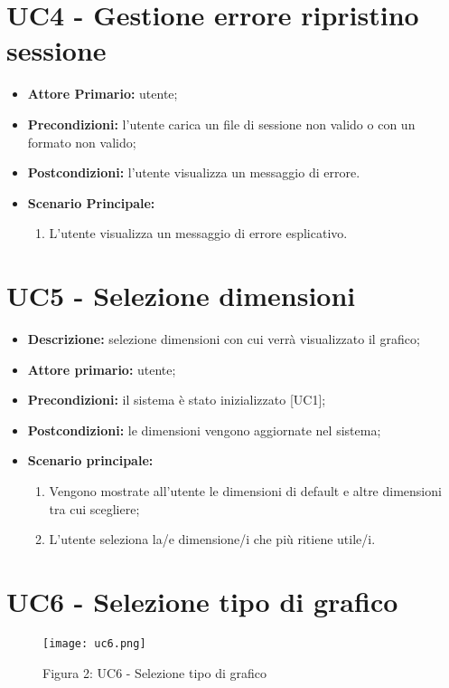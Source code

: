 \section{UC4 - Gestione errore ripristino sessione}
\begin{itemize}
  \item \textbf{Attore Primario:} utente;
  \item \textbf{Precondizioni:} l'utente carica un file di sessione non valido o con un formato non valido;
  \item \textbf{Postcondizioni:} l'utente visualizza un messaggio di errore.
  \item \textbf{Scenario Principale:}
  \begin{enumerate}
    \item L'utente visualizza un messaggio di errore esplicativo.
  \end{enumerate}
\end{itemize}

\section{UC5 - Selezione dimensioni}
 \begin{itemize}
     \item \textbf{Descrizione:} selezione dimensioni con cui verrà visualizzato il grafico;
     \item \textbf{Attore primario:} utente;
     \item \textbf{Precondizioni:} il sistema è stato inizializzato [UC1];
     \item \textbf{Postcondizioni:} le dimensioni vengono aggiornate nel sistema;
     \item \textbf{Scenario principale:}
     \begin{enumerate}
         \item Vengono mostrate all'utente le dimensioni di default e altre dimensioni tra cui scegliere;
         \item L'utente seleziona la/e dimensione/i che più ritiene utile/i.
     \end{enumerate}
 \end{itemize}


\section{UC6 - Selezione tipo di grafico}
\begin{figure}[H]
 \texttt{[image: uc6.png]}
 \vspace{-5mm}
 \caption*{Figura 2: UC6 - Selezione tipo di grafico}
\end{figure}

